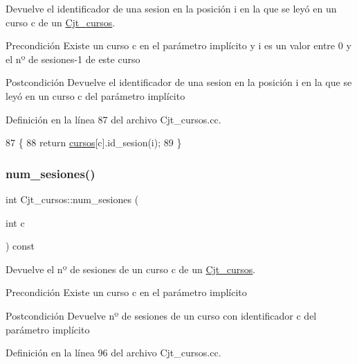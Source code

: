 Devuelve el identificador de una sesion en la posición i en la que se leyó en un curso c de un \mbox{\hyperlink{class_cjt__cursos}{Cjt\+\_\+cursos}}. 

\begin{DoxyPrecond}{Precondición}
Existe un curso c en el parámetro implícito y i es un valor entre 0 y el nº de sesiones-\/1 de este curso 
\end{DoxyPrecond}
\begin{DoxyPostcond}{Postcondición}
Devuelve el identificador de una sesion en la posición i en la que se leyó en un curso c del parámetro implícito 
\end{DoxyPostcond}


Definición en la línea 87 del archivo Cjt\+\_\+cursos.\+cc.


\begin{DoxyCode}
87                                                    \{
88       \textcolor{keywordflow}{return} \mbox{\hyperlink{class_cjt__cursos_a582f9540bc295212450dba4cd18c8886}{cursos}}[c].id\_sesion(i);
89     \}
\end{DoxyCode}
\mbox{\label{class_cjt__cursos_a3a8c9c5eecbdab5e1702233dab4d725b}} 
\subsubsection{\texorpdfstring{num\+\_\+sesiones()}{num\_sesiones()}}
{\footnotesize\ttfamily int Cjt\+\_\+cursos\+::num\+\_\+sesiones (\begin{DoxyParamCaption}\item[{int}]{c }\end{DoxyParamCaption}) const}



Devuelve el nº de sesiones de un curso c de un \mbox{\hyperlink{class_cjt__cursos}{Cjt\+\_\+cursos}}. 

\begin{DoxyPrecond}{Precondición}
Existe un curso c en el parámetro implícito 
\end{DoxyPrecond}
\begin{DoxyPostcond}{Postcondición}
Devuelve nº de sesiones de un curso con identificador c del parámetro implícito 
\end{DoxyPostcond}


Definición en la línea 96 del archivo Cjt\+\_\+cursos.\+cc.


